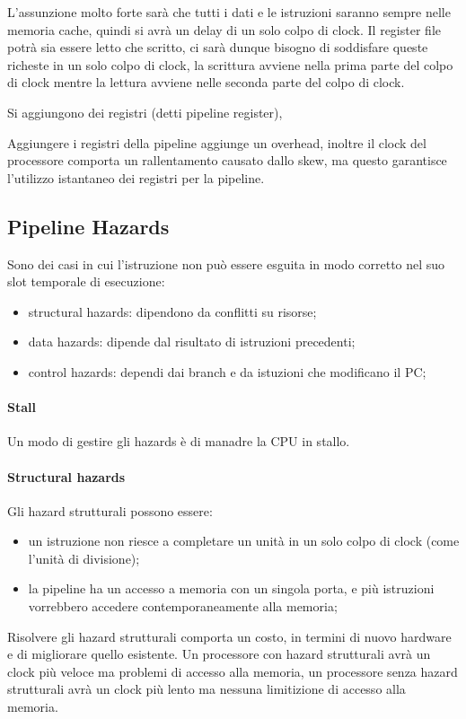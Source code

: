 \documentclass[12pt]{article}
\begin{document}
L'assunzione molto forte sar\`a che tutti i dati e le istruzioni saranno sempre nelle memoria cache, quindi si avr\`a un delay di un solo colpo di clock. Il register file potr\`a sia essere letto che scritto, ci sar\`a dunque bisogno di soddisfare queste richeste in un solo colpo di clock, la scrittura avviene nella prima parte del colpo di clock mentre la lettura avviene nelle seconda parte del colpo di clock.

Si aggiungono dei registri (detti pipeline register), 

Aggiungere i registri della pipeline aggiunge un overhead, inoltre il clock del processore comporta un rallentamento causato dallo skew, ma questo garantisce l'utilizzo istantaneo dei registri per la pipeline.

\subsection{Pipeline Hazards}
Sono dei casi in cui l'istruzione non pu\`o essere esguita in modo corretto nel suo slot temporale di esecuzione:
\begin{itemize}
    \item structural hazards: dipendono da conflitti su risorse;
    \item data hazards: dipende dal risultato di istruzioni precedenti;
    \item control hazards: dependi dai branch e da istuzioni che modificano il PC;
\end{itemize}

\paragraph{Stall}
Un modo di gestire gli hazards \`e di manadre la CPU in stallo.

\paragraph{Structural hazards}
Gli hazard strutturali possono essere:
\begin{itemize}
    \item un istruzione non riesce a completare un unit\`a in un solo colpo di clock (come l'unit\`a di divisione);
    \item la pipeline ha un accesso a memoria con un singola porta, e pi\`u istruzioni vorrebbero accedere contemporaneamente alla memoria;
\end{itemize}
Risolvere gli hazard strutturali comporta un costo, in termini di nuovo hardware e di migliorare quello esistente. Un processore con hazard strutturali avr\`a un clock pi\`u veloce ma problemi di accesso alla memoria, un processore senza hazard strutturali avr\`a un clock pi\`u lento ma nessuna limitizione di accesso alla memoria.
\end{document}
